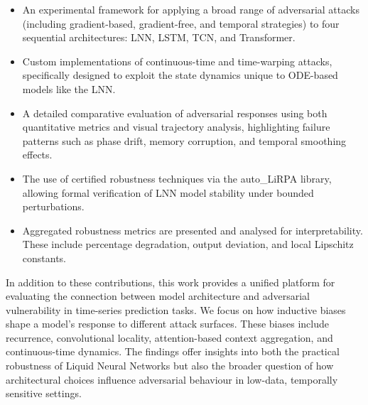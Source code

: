 \begin{itemize}
    \item An experimental framework for applying a broad range of adversarial attacks (including gradient-based, gradient-free, and temporal strategies) to four sequential architectures: LNN, LSTM, TCN, and Transformer.
    \item Custom implementations of continuous-time and time-warping attacks, specifically designed to exploit the state dynamics unique to ODE-based models like the LNN.
    \item A detailed comparative evaluation of adversarial responses using both quantitative metrics and visual trajectory analysis, highlighting failure patterns such as phase drift, memory corruption, and temporal smoothing effects.
    \item The use of certified robustness techniques via the auto\_LiRPA library, allowing formal verification of LNN model stability under bounded perturbations.
    \item Aggregated robustness metrics are presented and analysed for interpretability. These include percentage degradation, output deviation, and local Lipschitz constants.
\end{itemize}

In addition to these contributions, this work provides a unified platform for evaluating the connection between model architecture and adversarial vulnerability in time-series prediction tasks. We focus on how inductive biases shape a model's response to different attack surfaces. These biases include recurrence, convolutional locality, attention-based context aggregation, and continuous-time dynamics. The findings offer insights into both the practical robustness of Liquid Neural Networks but also the broader question of how architectural choices influence adversarial behaviour in low-data, temporally sensitive settings.